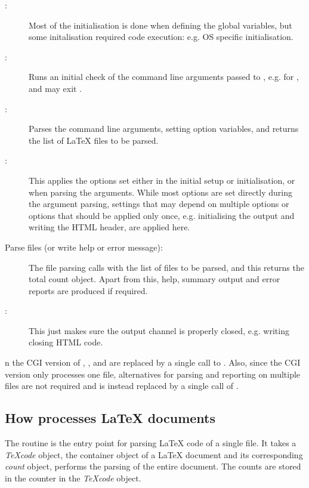 \documentclass{article}
\newcommand\Obj[1]{\textsl{#1}}
\def\CGI#1\CGIend{#1} %
\def\CGIend{}
\begin{document}
\begin{description}

\item[:]
Most of the initialisation is done when defining the global variables, but some initalisation required code execution: e.g. OS specific initialisation.

\item[:]
Runs an initial check of the command line arguments passed to \TeXcount{}, e.g. for , and may exit \TeXcount{}.

\item[:]
Parses the command line arguments, setting option variables, and returns the list of \LaTeX{} files to be parsed.

\item[:]
This applies the options set either in the initial setup or initialisation, or when parsing the arguments. While most options are set directly during the argument parsing, settings that may depend on multiple options or options that should be applied only once, e.g. initialising the output and writing the HTML header, are applied here.

\item[Parse files (or write help or error message):]
The file parsing calls  with the list of files to be parsed, and this returns the total count object. Apart from this, help, summary output and error reports are produced if required.

\item[:] This just makes sure the output channel is properly closed, e.g. writing closing HTML code.

\end{description}

\CGI
In the CGI version of \TeXcount{}, ,  and  are replaced by a single call to . Also, since the CGI version only processes one file, alternatives for parsing and reporting on multiple files are not required and is instead replaced by a single call of .
\CGIend


\subsection{How \TeXcount{} processes \LaTeX{} documents}

The  routine is the entry point for parsing \LaTeX{} code of a single file. It takes a \Obj{TeXcode} object, the container object of a \LaTeX{} document and its corresponding \Obj{count} object, performs the parsing of the entire document. The counts are stored in the counter in the \Obj{TeXcode} object.
\end{document}

